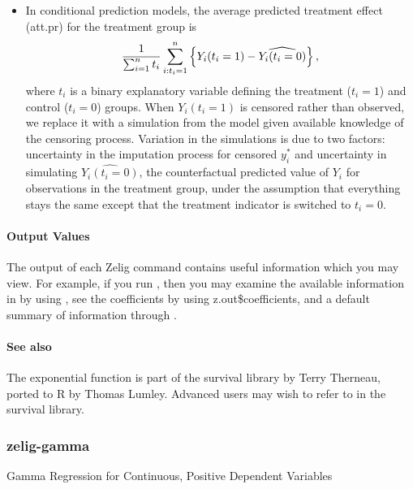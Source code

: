 \documentclass[letterpaper,10pt,english]{sphinxmanual}
\begin{document}
\begin{itemize}
\item {} 
In conditional prediction models, the average predicted treatment
effect (att.pr) for the treatment group is
\begin{gather}
\begin{split}\frac{1}{\sum_{i=1}^n t_i}\sum_{i:t_i=1}^n \left\{ Y_i(t_i=1) -
  \widehat{Y_i(t_i=0)} \right\},\end{split}\notag
\end{gather}
where \(t_i\) is a binary explanatory variable defining the
treatment (\(t_i=1\)) and control (\(t_i=0\)) groups. When
\(Y_i(t_i=1)\) is censored rather than observed, we replace it
with a simulation from the model given available knowledge of the
censoring process. Variation in the simulations is due to two
factors: uncertainty in the imputation process for censored
\(y_i^*\) and uncertainty in simulating
\(\widehat{Y_i(t_i=0)}\), the counterfactual predicted value of
\(Y_i\) for observations in the treatment group, under the
assumption that everything stays the same except that the treatment
indicator is switched to \(t_i=0\).

\end{itemize}


\paragraph{Output Values}
\label{zelig-exp:output-values}
The output of each Zelig command contains useful information which you
may view. For example, if you run
, then you may
examine the available information in  by using
, see the coefficients by using z.out\$coefficients, and
a default summary of information through .


\paragraph{See also}
\label{zelig-exp:see-also}
The exponential function is part of the survival library by Terry
Therneau, ported to R by Thomas Lumley. Advanced users may wish to refer
to  in the survival library.


\subsubsection{zelig-gamma}
\label{zelig-gamma:zgamma}\label{zelig-gamma::doc}\label{zelig-gamma:zelig-gamma}
Gamma Regression for Continuous, Positive Dependent Variables
\end{document}
